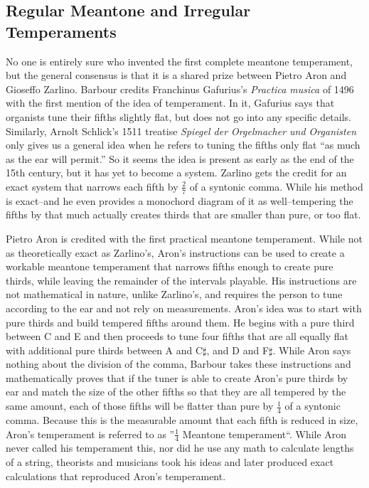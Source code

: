 \subsection{Regular Meantone and Irregular Temperaments}

No one is entirely sure who invented the first complete meantone temperament, but the
general consensus is that it is a shared prize between Pietro Aron and Gioseffo Zarlino.
Barbour credits Franchinus Gafurius's \textit{Practica musica} of 1496 with the first
mention of the idea of temperament.  In it, Gafurius says that organists tune their fifths
slightly flat, but does not go into any specific details.\autocite[25]{MB:1}  Similarly,
Arnolt Schlick's 1511 treatise \textit{Spiegel der Orgelmacher und Organisten} only gives
us a general idea when he refers to tuning the fifths only flat ``as much as the ear will
permit.'' \autocite[202]{RR:1}  So it seems the idea is present as early as the end of the
15th century, but it has yet to become a system.  Zarlino gets the credit for an exact
system that narrows each fifth by $\frac{2}{7}$ of a syntonic comma.  While his method is
exact--and he even provides a monochord diagram of it as well--tempering the fifths by
that much actually creates thirds that are smaller than pure, or too flat.

Pietro Aron is credited with the first practical meantone temperament.  While not as
theoretically exact as Zarlino's, Aron's instructions can be used to create a workable
meantone temperament that narrows fifths enough to create pure thirds, while leaving the
remainder of the intervals playable.  His instructions are not mathematical in nature,
unlike Zarlino's, and requires the person to tune according to the ear and not rely on
measurements.  Aron's idea was to start with pure thirds and build tempered fifths around
them.  He begins with a pure third between C and E and then proceeds to tune four fifths
that are all equally flat with additional pure thirds between A and C$\sharp$, and D and
F$\sharp$.  While Aron says nothing about the division of the comma, Barbour takes these
instructions and mathematically proves that if the tuner is able to create Aron's pure
thirds by ear and match the size of the other fifths so that they are all tempered by the
same amount, each of those fifths will be flatter than pure by $ \frac{1}{4} $ of a
syntonic comma.\autocite[27]{MB:1}  Because this is the measurable amount that each fifth
is reduced in size, Aron's temperament is referred to as ''$ \frac{1}{4} $ Meantone
temperament``. While Aron never called his temperament this, nor did he use any math to
calculate lengths of a string, theorists and musicians took his ideas and later produced
exact calculations that reproduced Aron's temperament.

